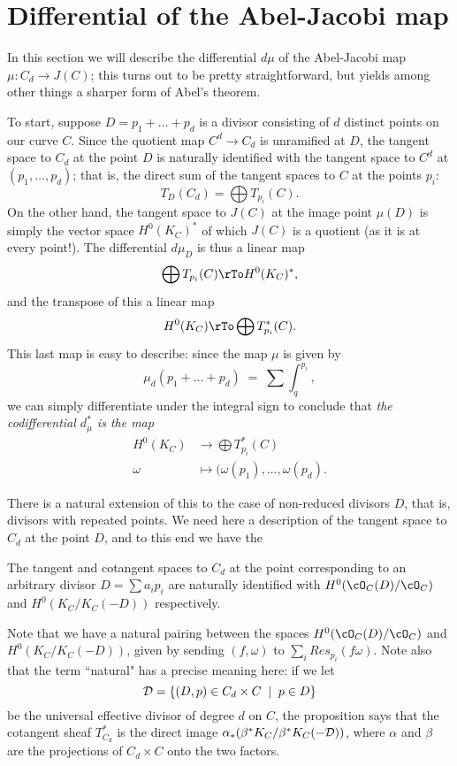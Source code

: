 \section{Differential of the Abel-Jacobi map}

In this section we will describe the differential $d\mu$ of the Abel-Jacobi map $\mu : C_d \to J(C)$; this turns out to be pretty straightforward, but yields among other things a sharper form of Abel's theorem.

To start, suppose $D = p_1 + \dots + p_d$ is a divisor consisting of $d$ distinct points on our curve $C$. Since the quotient map $C^d \to C_d$ is unramified at $D$, the tangent space to $C_d$ at the point $D$ is naturally identified with the tangent space to $C^d$ at $(p_1,\dots,p_d)$; that is, the direct sum of the tangent spaces to $C$ at the points $p_i$:
$$
T_D(C_d) = \bigoplus T_{p_i}(C).
$$
On the other hand, the tangent space to $J(C)$ at the image point $\mu(D)$ is simply the vector space $H^0(K_C)^*$ of which $J(C)$ is a quotient (as it is at every point!). The differential $d\mu_D$ is thus a linear map
$$
\bigoplus T_{p_i}(C) \rTo H^0(K_C)^*,
$$
and the transpose of this a linear map
$$
H^0(K_C) \rTo \bigoplus T^*_{p_i}(C).
$$
This last map is easy to describe: since the map $\mu$ is given by 
$$
\mu_d(p_1 + \dots + p_d) \; = \; \sum \int_q^{p_i},
$$
we can simply differentiate under the integral sign to conclude that \emph{the codifferential $d_\mu^*$ is the map}
\begin{align*}
H^0(K_C) &\to \bigoplus T^*_{p_i}(C) \\
\omega &\mapsto (\omega(p_1), \dots, \omega(p_d).
\end{align*}

There is a natural extension of this to the case of non-reduced divisors $D$, that is, divisors with repeated points. We need here a description of the tangent space to $C_d$ at the point $D$, and to this end we have the

\begin{proposition}\label{symmetric product tangent space}
The tangent and cotangent spaces to $C_d$ at the point corresponding to an arbitrary divisor $D = \sum a_ip_i$ are naturally identified with $H^0(\cO_C(D)/\cO_C)$ and $H^0(K_C/K_C(-D))$ respectively.
\end{proposition}

Note that we have a natural pairing between the spaces $H^0(\cO_C(D)/\cO_C)$ and $H^0(K_C/K_C(-D))$, given by sending $(f, \omega)$ to $\sum_i Res_{p_i}(f\omega)$. Note also that the term ``natural" has a precise meaning here: if we let 
$$
\cD = \{ (D, p) \in C_d \times C \; \mid \; p \in D \}
$$
be the universal effective divisor of degree $d$ on $C$, the proposition says that the cotangent sheaf $T^*_{C_d}$ is the direct image $\alpha_*(\beta^*K_C/\beta^*K_C(-\cD))$, where $\alpha$ and $\beta$ are the projections of $C_d \times C$ onto the two factors.


